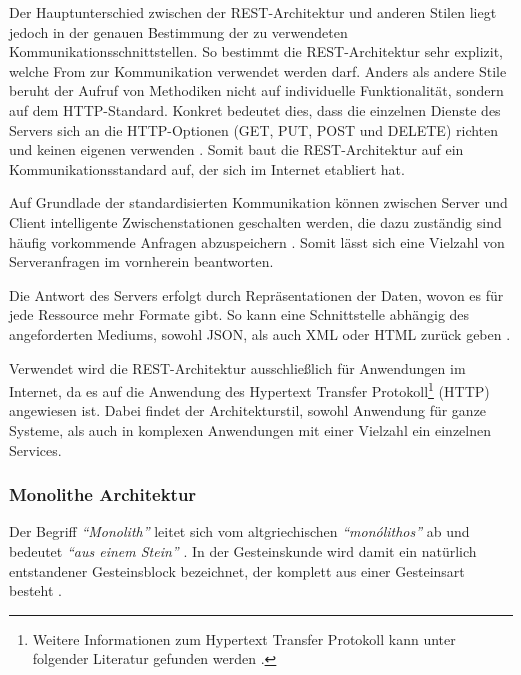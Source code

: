 Der Hauptunterschied zwischen der REST-Architektur und anderen Stilen liegt jedoch in der genauen Bestimmung der zu verwendeten Kommunikationsschnittstellen. So bestimmt die REST-Architektur sehr explizit, welche From zur Kommunikation verwendet werden darf. Anders als andere Stile beruht der Aufruf von Methodiken nicht auf individuelle Funktionalität, sondern auf dem HTTP-Standard. Konkret bedeutet dies, dass die einzelnen Dienste des Servers sich an die HTTP-Optionen (GET, PUT, POST und DELETE) richten und keinen eigenen verwenden \parencite[vlg.][S. 128]{starke_effektive_2015}. Somit baut die REST-Architektur auf ein Kommunikationsstandard auf, der sich im Internet etabliert hat.


Auf Grundlade der standardisierten Kommunikation können zwischen Server und Client intelligente Zwischenstationen geschalten werden, die dazu zuständig sind häufig vorkommende Anfragen abzuspeichern \parencites[vlg.][S. 79 f.]{fielding_architectural_2000}[][S. 128]{starke_effektive_2015}. Somit lässt sich eine Vielzahl von Serveranfragen im vornherein beantworten.

Die Antwort des Servers erfolgt durch Repräsentationen der Daten, wovon es für jede Ressource mehr Formate gibt. So kann eine Schnittstelle abhängig des angeforderten Mediums, sowohl JSON­, als auch XML­ oder HTML zurück geben \parencite[vgl.][S. 128]{starke_effektive_2015}.

Verwendet wird die REST-Architektur ausschließlich für Anwendungen im Internet, da es auf die Anwendung des Hypertext Transfer Protokoll\footnote{Weitere Informationen zum Hypertext Transfer Protokoll kann unter folgender Literatur gefunden werden \parencite{leach_hypertext_2020}.} (HTTP) angewiesen ist. Dabei findet der Architekturstil, sowohl Anwendung für ganze Systeme, als auch in komplexen Anwendungen mit einer Vielzahl ein einzelnen Services.


\subsubsection{Monolithe Architektur}

Der Begriff \textit{\enquote{Monolith}} leitet sich vom altgriechischen \textit{\enquote{monólithos}} ab und bedeutet \textit{\enquote{aus einem Stein}} \parencites[vlg.][]{duden_nodate}[vgl.][]{dwds_nodate}. In der Gesteinskunde wird damit ein natürlich entstandener Gesteinsblock bezeichnet, der komplett aus einer Gesteinsart besteht \parencite[vgl.][]{dwds_nodate}.

